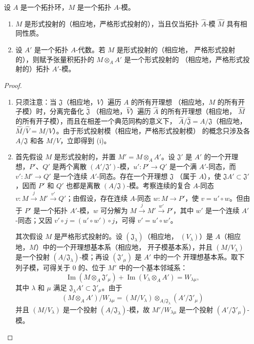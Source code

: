 \begin{proposition}[19.2.5]
\label{0.19.2.5-fr}
设 $A$ 是一个拓扑环，$M$ 是一个拓扑 $A$-模。
\begin{enumerate}
  \item[(i)] $M$ 是形式投射的（相应地，严格形式投射的），当且仅当拓扑
  $\hat A$-模 $\hat M$ 具有相同性质。
  \item[(ii)] 设 $A'$ 是一个拓扑 $A$-代数。若 $M$ 是形式投射的（相应地，
  严格形式投射的），则赋予张量积拓扑的 $M\otimes_A A'$ 是一个形式投射的
  （相应地，严格形式投射的）拓扑 $A'$-模。
\end{enumerate}
\end{proposition}

\begin{proof}
\begin{enumerate}
  \item[(i)] 只须注意：当 $\mathfrak J$（相应地，$V$）遍历 $A$ 的所有开理想
  （相应地，$M$ 的所有开子模）时，分离完备化 $\hat{\mathfrak J}$
  （相应地，$\hat V$）遍历 $\hat A$ 的所有开理想（相应地，
  $\hat M$ 的所有开子模），而且在相差一个典范同构的意义下，
  $\hat A/\hat{\mathfrak J}=A/\mathfrak J$（相应地，
  $\hat M/\hat V=M/V$）。由于形式投射模（相应地，严格形式投射模）
  的概念只涉及各 $A/\mathfrak J$ 和各 $M/V$，立即得到 (i)。
  \item[(ii)] 首先假设 $M$ 是形式投射的，并置 $M'=M\otimes_A A'$。设
  $\mathfrak J'$ 是 $A'$ 的一个开理想，$P'$、$Q'$ 是两个离散
  $(A'/\mathfrak J')$-模，$u':P'\to Q'$ 是一个满 $A'$-同态，而
  $v':M'\to Q'$ 是一个连续 $A'$-同态。存在一个开理想 $\mathfrak J$
  （属于 $A$），使 $\mathfrak JA'\subset\mathfrak J'$，因而 $P'$ 和
  $Q'$ 也都是离散 $(A/\mathfrak J)$-模。考察连续的复合 $A$-同态
  $v:M\xrightarrow{j}M'\xrightarrow{v'}Q'$；由假设，存在连续
  $A$-同态 $w:M\to P'$，使 $v=u'\circ w$。但由于 $P'$ 是一个拓扑
  $A'$-模，$w$ 可分解为
  $M\xrightarrow{j}M'\xrightarrow{w'}P'$，其中 $w'$ 是一个连续
  $A'$-同态；又因 $v'\circ j=(u'\circ w')\circ j$，可得
  $v'=u'\circ w'$。

  其次假设 $M$ 是严格形式投射的。设 $(\mathfrak J_\lambda)$（相应地，
  $(V_\lambda)$）是 $A$（相应地，$M$）中的一个开理想基本系（相应地，
  开子模基本系），并且 $(M/V_\lambda)$ 是一个投射
  $(A/\mathfrak J_\lambda)$-模；再设 $(\mathfrak J'_\mu)$ 是 $A'$ 中的一个
  开理想基本系。取下列子模，可得关于 $0$ 的、位于 $M'$ 中的一个基本邻域系：
  \[
    \operatorname{Im}(M\otimes_A\mathfrak J'_\mu)
    +\operatorname{Im}(V_\lambda\otimes_A A')=W_{\lambda\mu},
  \]
  其中 $\lambda$ 和 $\mu$ 满足
  $\mathfrak J_\lambda A'\subset\mathfrak J'_\mu$。由于
  \[
    (M\otimes_A A')/W_{\lambda\mu}
    =(M/V_\lambda)\otimes_{A/\mathfrak J_\lambda}
      (A'/\mathfrak J'_\mu)
  \]
  并且 $(M/V_\lambda)$ 是一个投射 $(A/\mathfrak J_\lambda)$-模，故
  $M'/W_{\lambda\mu}$ 是一个投射 $(A'/\mathfrak J'_\mu)$-模。
\end{enumerate}
\end{proof}

